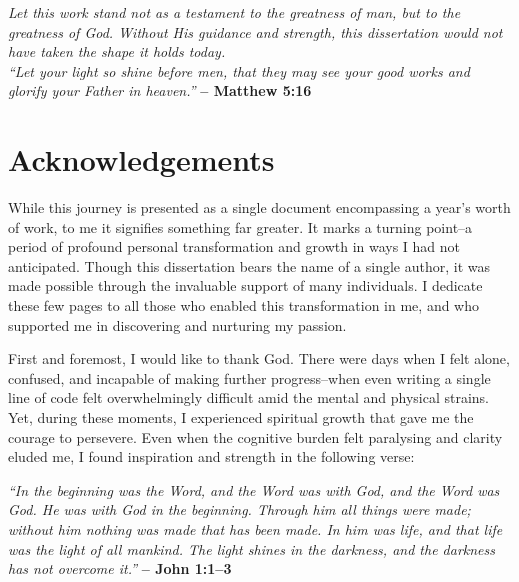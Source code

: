 \pagebreak
\clearpage
\vspace*{\fill}

{
\large
\hspace{3.5cm} \hfill \textit{Let this work stand not as a testament to the greatness of man, but to the greatness of God. Without His guidance and strength, this dissertation would not have taken the shape it holds today.\\[1em]
\noindent ``Let your light so shine before men, that they may see your good works and glorify your Father in heaven.''}
\textbf{-- Matthew 5:16}
}

\vspace*{\fill}

\clearpage

\chapter*{Acknowledgements}

\noindent While this journey is presented as a single document encompassing a year’s worth of work, to me it signifies something far greater. It marks a turning point--a period of profound personal transformation and growth in ways I had not anticipated. Though this dissertation bears the name of a single author, it was made possible through the invaluable support of many individuals. I dedicate these few pages to all those who enabled this transformation in me, and who supported me in discovering and nurturing my passion.

\bigskip

\noindent First and foremost, I would like to thank God. There were days when I felt alone, confused, and incapable of making further progress--when even writing a single line of code felt overwhelmingly difficult amid the mental and physical strains. Yet, during these moments, I experienced spiritual growth that gave me the courage to persevere. Even when the cognitive burden felt paralysing and clarity eluded me, I found inspiration and strength in the following verse:

\bigskip\bigskip

\noindent
\textit{``In the beginning was the Word, and the Word was with God, and the Word was God. He was with God in the beginning. Through him all things were made; without him nothing was made that has been made. In him was life, and that life was the light of all mankind. The light shines in the darkness, and the darkness has not overcome it.''} \textbf{-- John 1:1–3}

